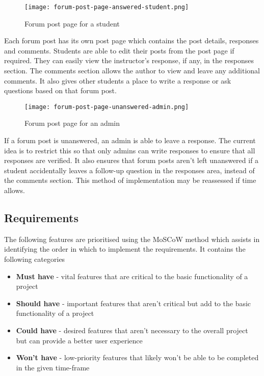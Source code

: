 \begin{figure}[h!]
    \texttt{[image: forum-post-page-answered-student.png]}
    \centering
    \caption{Forum post page for a student}
\end{figure}

Each forum post has its own post page which contains the post details, responses and comments.
Students are able to edit their posts from the post page if required.
They can easily view the instructor's response, if any, in the responses section.
The comments section allows the author to view and leave any additional comments.
It also gives other students a place to write a response or ask questions based on that forum post.

\begin{figure}[h!]
    \texttt{[image: forum-post-page-unanswered-admin.png]}
    \centering
    \caption{Forum post page for an admin}
\end{figure}

If a forum post is unanswered, an admin is able to leave a response.
The current idea is to restrict this so that only admins can write responses to ensure that all responses are verified.
It also ensures that forum posts aren't left unanswered if a student accidentally leaves a follow-up question in the responses area, instead of the comments section.
This method of implementation may be reassessed if time allows.

\subsection{Requirements}
The following features are prioritised using the MoSCoW method which assists in identifying the order in which to implement the requirements. \cite{moscow}
It contains the following categories

\begin{itemize}
    \item \textbf{Must have} - vital features that are critical to the basic functionality of a project
    \item \textbf{Should have} - important features that aren't critical but add to the basic functionality of a project
    \item \textbf{Could have} - desired features that aren't necessary to the overall project but can provide a better user experience
    \item \textbf{Won't have} - low-priority features that likely won't be able to be completed in the given time-frame
\end{itemize}

